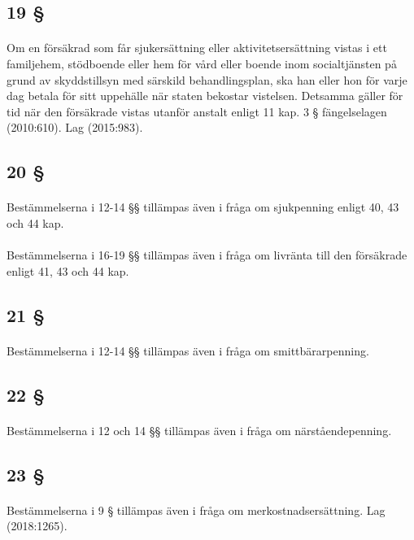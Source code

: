 \documentclass[a4paper,notitlepage,openany,10pt]{book}
\begin{document}
\subsection*{19 §}
\paragraph*{}
Om en försäkrad som får sjukersättning eller aktivitetsersättning vistas i ett familjehem, stödboende eller hem för vård eller boende inom socialtjänsten på grund av skyddstillsyn med särskild behandlingsplan, ska han eller hon för varje dag betala för sitt uppehälle när staten bekostar vistelsen. Detsamma gäller för tid när den försäkrade vistas utanför anstalt enligt 11 kap. 3 § fängelselagen (2010:610).
Lag (2015:983).
\subsection*{20 §}
\paragraph*{}
Bestämmelserna i 12-14 §§ tillämpas även i fråga om sjukpenning enligt 40, 43 och 44 kap.
\paragraph*{}
Bestämmelserna i 16-19 §§ tillämpas även i fråga om livränta till den försäkrade enligt 41, 43 och 44 kap.
\subsection*{21 §}
\paragraph*{}
Bestämmelserna i 12-14 §§ tillämpas även i fråga om smittbärarpenning.
\subsection*{22 §}
\paragraph*{}
Bestämmelserna i 12 och 14 §§ tillämpas även i fråga om närståendepenning.
\subsection*{23 §}
\paragraph*{}
Bestämmelserna i 9 § tillämpas även i fråga om merkostnadsersättning.
Lag (2018:1265).
\end{document}
